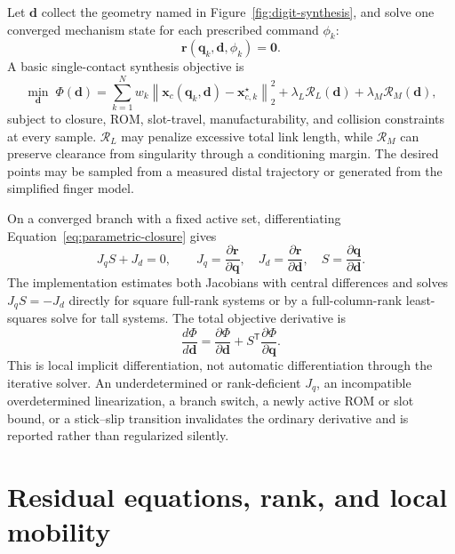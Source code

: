 \documentclass[11pt]{article}
\begin{document}
Let $\mathbf d$ collect the geometry named in
Figure~\ref{fig:digit-synthesis}, and solve one converged mechanism state for
each prescribed command $\phi_k$:
\begin{equation}
  \mathbf r(\mathbf q_k,\mathbf d,\phi_k)=\mathbf 0.
  \label{eq:parametric-closure}
\end{equation}
A basic single-contact synthesis objective is
\begin{equation}
  \min_{\mathbf d}\;\Phi(\mathbf d)=
  \sum_{k=1}^{N}w_k
  \left\|\mathbf x_c(\mathbf q_k,\mathbf d)
  -\mathbf x^{\star}_{c,k}\right\|_2^2
  +\lambda_L\mathcal R_L(\mathbf d)
  +\lambda_M\mathcal R_M(\mathbf d),
  \label{eq:design-objective}
\end{equation}
subject to closure, ROM, slot-travel, manufacturability, and collision
constraints at every sample. $\mathcal R_L$ may penalize excessive total link
length, while $\mathcal R_M$ can preserve clearance from singularity through a
conditioning margin. The desired points may be sampled from a measured distal
trajectory or generated from the simplified finger model.

On a converged branch with a fixed active set, differentiating
Equation~\eqref{eq:parametric-closure} gives
\begin{equation}
  J_q S+J_d=0,\qquad
  J_q=\frac{\partial\mathbf r}{\partial\mathbf q},\quad
  J_d=\frac{\partial\mathbf r}{\partial\mathbf d},\quad
  S=\frac{\partial\mathbf q}{\partial\mathbf d}.
  \label{eq:implicit-sensitivity}
\end{equation}
The implementation estimates both Jacobians with central differences and
solves $J_qS=-J_d$ directly for square full-rank systems or by a full-column-rank
least-squares solve for tall systems. The total objective derivative is
\begin{equation}
  \frac{d\Phi}{d\mathbf d}
  =\frac{\partial\Phi}{\partial\mathbf d}
   +S^{\mathsf T}\frac{\partial\Phi}{\partial\mathbf q}.
  \label{eq:objective-gradient}
\end{equation}
This is local implicit differentiation, not automatic differentiation through
the iterative solver. An underdetermined or rank-deficient $J_q$, an
incompatible overdetermined linearization, a branch switch, a newly active ROM
or slot bound, or a stick--slip transition invalidates the ordinary derivative
and is reported rather than regularized silently.

\section{Residual equations, rank, and local mobility}
\end{document}
